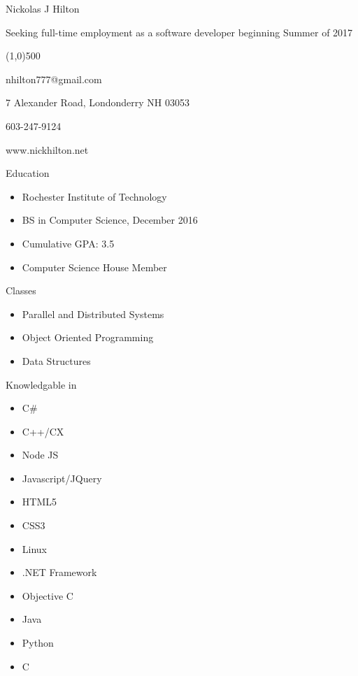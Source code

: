 \documentclass{article}
\begin{document}
\begin{minipage}[t]{0.5\textwidth}
  {\LARGE Nickolas J Hilton }
\end{minipage}
\begin{minipage}[b]{0.5\textwidth}
  \begin{flushright}
  Seeking full-time employment as a software developer beginning Summer of 2017 
  \end{flushright}
\end{minipage}
\begin{center}
  \line(1,0){500}
\end{center}
\begin{inparaitem}
  \item nhilton777@gmail.com 
  \item 7 Alexander Road, Londonderry NH 03053 
  \item 603-247-9124 
  \item www.nickhilton.net 
\end{inparaitem}
{\Large Education } 
\begin{itemize}
  \item Rochester Institute of Technology 
  \item BS in Computer Science, December 2016 
  \item Cumulative GPA: 3.5 
  \item Computer Science House Member 
\end{itemize}
{\Large Classes } 
\begin{itemize}
  \item Parallel and Distributed Systems 
  \item Object Oriented Programming 
  \item Data Structures 
\end{itemize}
{\Large Knowledgable in } 
\begin {itemize}
  \item C\# 
  \item C++/CX 
  \item Node JS 
  \item Javascript/JQuery 
  \item HTML5 
  \item CSS3 
  \item Linux
  \item .NET Framework 
  \item Objective C 
  \item Java 
  \item Python 
  \item C 
\end{itemize}
\end{document}
